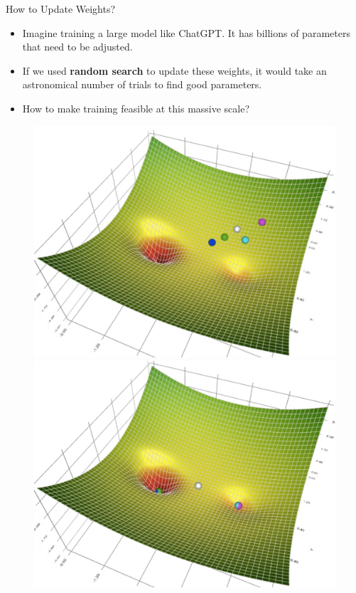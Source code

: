 \documentclass[serif, aspectratio=169]{beamer}
\begin{document}
\begin{frame}{How to Update Weights?}
    \begin{itemize}
        \item Imagine training a large model like ChatGPT. It has billions of parameters that need to be adjusted.
        \item If we used \textbf{random search} to update these weights, it would take an astronomical number of trials to find good parameters.
        \item How to make training feasible at this massive scale?
    \end{itemize}
    \begin{figure}[!htb]
  \begin{minipage}{0.3\textwidth}
     \centering
     \includegraphics[width=.9\linewidth]{pic/gd1.png}
  \end{minipage}\hfill
    \begin{minipage}{0.3\textwidth}
     \centering
     \includegraphics[width=.9\linewidth]{pic/gd2.png}

\end{minipage}
\end{figure}
\end{frame}
\end{document}
